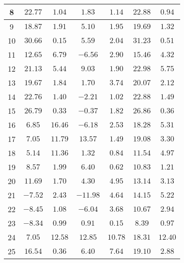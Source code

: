 \begin{table}[H]
\begin{tabular}{|c|c|c|c|c|c|c|}
                        8   &   $22.77$  &  $1.04$   &  $1.83$    &  $1.14$   &  $22.88$  & $0.94$  \\ \hline
                        9   &   $18.87$  &  $1.91$   &  $5.10$    &  $1.95$   &  $19.69$  & $1.32$  \\ \hline
                        10  &   $30.66$  &  $0.15$   &  $5.59$    &  $2.04$   &  $31.23$  & $0.51$  \\ \hline
                        11  &   $12.65$  &  $6.79$   &  $-6.56$   &  $2.90$   &  $15.46$  & $4.32$  \\ \hline
                        12  &   $21.13$  &  $5.44$   &  $9.03$    &  $1.90$   &  $22.98$  & $5.75$  \\ \hline
                        13  &   $19.67$  &  $1.84$   &  $1.70$    &  $3.74$   &  $20.07$  & $2.12$  \\ \hline
                        14  &   $22.76$  &  $1.40$   &  $-2.21$   &  $1.02$   &  $22.88$  & $1.49$  \\ \hline
                        15  &   $26.79$  &  $0.33$   &  $-0.37$   &  $1.82$   &  $26.86$  & $0.36$  \\ \hline
                        16  &   $6.85$   &  $16.46$  &  $-6.18$   &  $2.53$   &  $18.28$  & $5.31$  \\ \hline
                        17  &   $7.05$   &  $11.79$  &  $13.57$   &  $1.49$   &  $19.08$  & $3.30$  \\ \hline
                        18  &   $5.14$   &  $11.36$  &  $1.32$    &  $0.84$   &  $11.54$  & $4.97$  \\ \hline
                        19  &   $8.57$   &  $1.99$   &  $6.40$    &  $0.62$   &  $10.83$  & $1.21$  \\ \hline
                        20  &   $11.69$  &  $1.70$   &  $4.30$    &  $4.95$   &  $13.14$  & $3.13$  \\ \hline
                        21  &   $-7.52$  &  $2.43$   &  $-11.98$  &  $4.64$   &  $14.15$  & $5.22$  \\ \hline
                        22  &   $-8.45$  &  $1.08$   &  $-6.04$   &  $3.68$   &  $10.67$  & $2.94$  \\ \hline
                        23  &   $-8.34$  &  $0.99$   &  $0.91$    &  $0.15$   &  $8.39$   & $0.97$  \\ \hline
                        24  &   $7.05$   &  $12.58$  &  $12.85$   &  $10.78$  &  $18.31$  & $12.40$  \\ \hline
                        25  &   $16.54$  &  $0.36$   &  $6.40$    &  $7.64$   &  $19.10$  & $2.88$  \\ \hline

\end{tabular}
\end{table}
